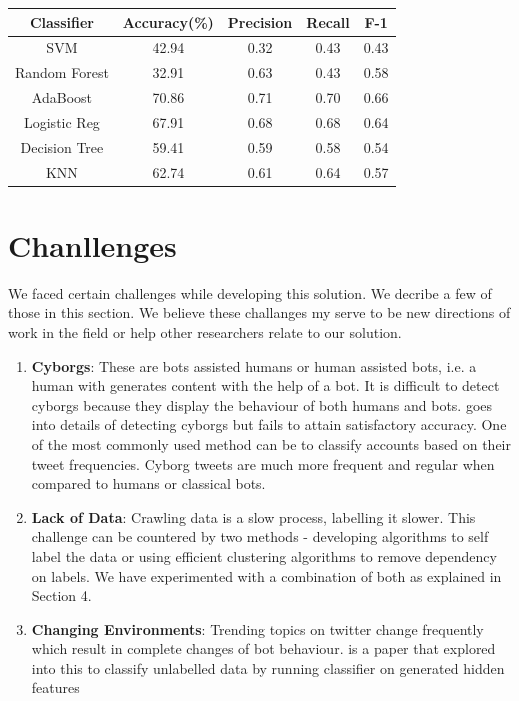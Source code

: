 \documentclass[journal]{IEEEtran}
\begin{document}
\begin{center}
 \begin{tabular}{||c c c c c||} 
 \hline
 Classifier & Accuracy(\%) & Precision & Recall & F-1 \\ [0.5ex] 
 \hline\hline
 SVM & 42.94 & 0.32 & 0.43 & 0.43 \\ 
 \hline
 Random Forest & 32.91 & 0.63 & 0.43 & 0.58 \\
 \hline
 AdaBoost & 70.86 & 0.71 & 0.70 & 0.66 \\
 \hline
 Logistic Reg & 67.91 & 0.68 & 0.68 & 0.64 \\
 \hline
 Decision Tree & 59.41 & 0.59 & 0.58 & 0.54 \\
 \hline
 KNN& 62.74 & 0.61 & 0.64 & 0.57 \\ [1ex] 
 \hline
\end{tabular}
\end{center}


\section{Chanllenges}
We faced certain challenges while developing this solution. We decribe a few of those in this section. We believe these challanges my serve to be new directions of work in the field or help other researchers relate to our solution.

\begin{enumerate}
	\item \textbf{Cyborgs}\cite{Cyborg}: These are bots assisted humans or human assisted bots, i.e. a human with generates content with the help of a bot. It is difficult to detect cyborgs because they display the behaviour of both humans and bots. \cite{Cyborg} goes into details of detecting cyborgs but fails to attain satisfactory accuracy. One of the most commonly used method can be to classify accounts based on their tweet frequencies. Cyborg tweets are much more frequent and regular when compared to humans or classical bots.
	\item \textbf{Lack of Data}: Crawling data is a slow process, labelling it slower. This challenge can be countered by two methods - developing algorithms to self label the data or using efficient clustering algorithms to remove dependency on labels. We have experimented with a combination of both as explained in Section 4.
	\item \textbf{Changing Environments}: Trending topics on twitter change frequently which result in complete changes of bot behaviour. \cite{Dynamic-Bot} is a paper that explored into this to classify unlabelled data by running classifier on generated hidden features
\end{enumerate}
\end{document}
